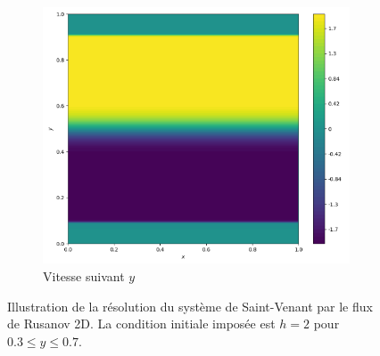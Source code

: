 \documentclass[
	french,
	11pt, %
]{fphw}
\begin{document}
\begin{figure}[H]
\begin{subfigure}{0.32\textwidth}
		\label{fig:Rusa2u}
	\end{subfigure}
	\begin{subfigure}{0.32\textwidth}
		\centering
		\includegraphics[width=\textwidth,height=0.85\textwidth]{Rusa2v.png}
		\caption{Vitesse suivant $y$}
		\label{fig:Rusa2v}
	\end{subfigure}
	\caption{Illustration de la résolution du système de Saint-Venant par le flux de Rusanov 2D. La condition initiale imposée est  $ h = 2$ pour $ 0.3 \leq y \leq 0.7$.}
	\label{fig:Rusa2}
\end{figure}
\end{document}
